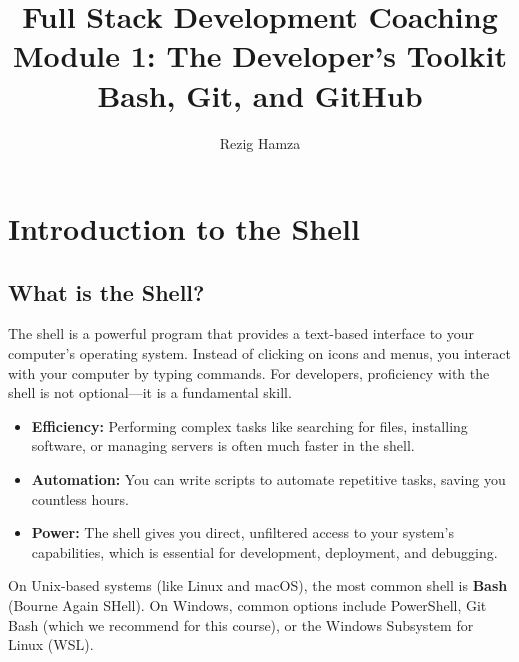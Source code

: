 \documentclass[11pt, a4paper]{article}
\begin{document}
\title{
    \vspace{-2cm}
    \color{primaryColor}\bfseries\Huge
    Full Stack Development Coaching \\
    \vspace{0.5cm}
    \color{secondaryColor}\LARGE
    Module 1: The Developer's Toolkit \\ Bash, Git, and GitHub
}
\author{Rezig Hamza}
\date{}
\maketitle
\thispagestyle{empty}
\newpage

\tableofcontents
\newpage

\section{Introduction to the Shell}

\subsection{What is the Shell?}
The shell is a powerful program that provides a text-based interface to your computer's operating system. Instead of clicking on icons and menus, you interact with your computer by typing commands. For developers, proficiency with the shell is not optional—it is a fundamental skill.

\begin{itemize}
    \item \textbf{Efficiency:} Performing complex tasks like searching for files, installing software, or managing servers is often much faster in the shell.
    \item \textbf{Automation:} You can write scripts to automate repetitive tasks, saving you countless hours.
    \item \textbf{Power:} The shell gives you direct, unfiltered access to your system's capabilities, which is essential for development, deployment, and debugging.
\end{itemize}

On Unix-based systems (like Linux and macOS), the most common shell is \textbf{Bash} (Bourne Again SHell). On Windows, common options include PowerShell, Git Bash (which we recommend for this course), or the Windows Subsystem for Linux (WSL).
\end{document}
